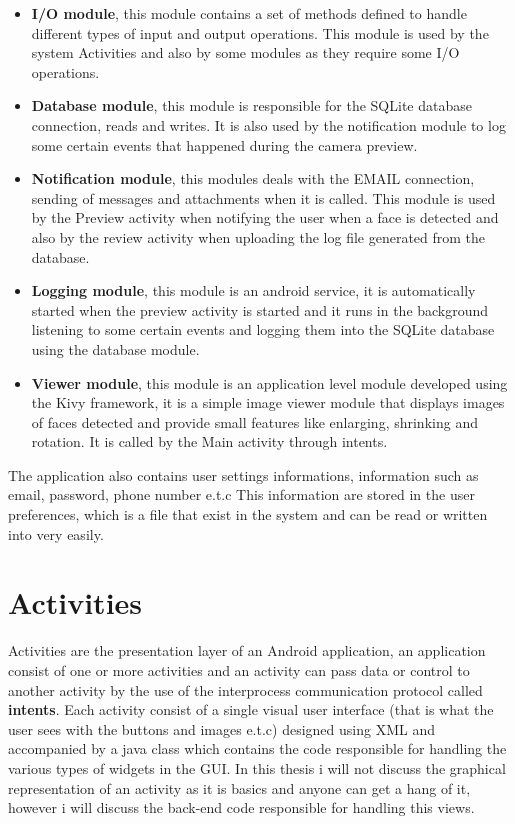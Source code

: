 \begin{itemize}
\item {\bf I/O module}, this module contains a set of methods defined to handle different types of input and output operations. This module is used by the system Activities and also by some modules as they require some I/O operations.

\item{\bf Database module}, this module is responsible for the SQLite database connection, reads and writes. It is also used by the notification module to log some certain events that happened during the camera preview.

\item{\bf Notification module}, this modules deals with the EMAIL connection, sending of messages and attachments when it is called. This module is used by the Preview activity when notifying the user when a face is detected and also by the review activity when uploading the log file generated from the database.
 
\item{\bf Logging module}, this module is an android service, it is automatically started when the preview activity is started and it runs in the background listening to some certain events and logging them into the SQLite database using the database module.

\item{\bf Viewer module}, this module is an application level module developed using the Kivy framework, it is a simple image viewer module that displays images of faces detected and provide small features like enlarging, shrinking and rotation. It is called by the Main activity through intents.
\end{itemize}
The application also contains user settings informations, information such as email, password, phone number e.t.c This information are stored in the user preferences, which is a file that exist in the system and can be read or written into very easily.

\section{Activities}
Activities are the presentation layer of an Android application, an application consist of one or more activities and an activity can pass data or control to another activity by the use of the interprocess communication protocol called {\bf intents}. Each activity consist of a single visual user interface (that is what the user sees with the buttons and images e.t.c) designed using XML and accompanied by a java class which contains the code responsible for handling the various types of widgets in the GUI. In this thesis i will not discuss the graphical representation of an activity as it is basics and anyone can get a hang of it, however i will discuss the back-end code responsible for handling this views.

